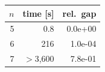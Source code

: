 \begin{tabular}{r r r}
\toprule
$n$ & time [s] & rel.\ gap \\
\midrule
5 & 0.8 & 0.0e+00 \\
6 & 216 & 1.0e-04 \\
7 & $>$3,600 & 7.8e-01 \\
\bottomrule
\end{tabular}
